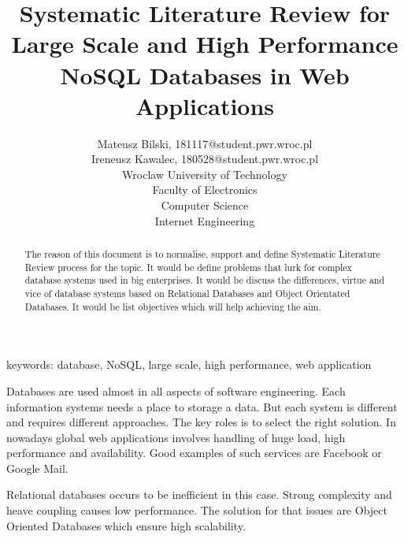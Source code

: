 \documentclass[times, 10pt,twocolumn]{article}
\begin{document}
 

\title{ Systematic Literature Review
       for Large Scale and High Performance NoSQL Databases in Web Applications}

\author{Mateusz Bilski, 181117@student.pwr.wroc.pl \\ Ireneusz Kawalec, 180528@student.pwr.wroc.pl \\ 
Wroclaw University of Technology\\ Faculty of Electronics \\ Computer Science \\ Internet Engineering  \\  
}

\maketitle
\thispagestyle{empty}

\begin{abstract}  

The reason of this document is to normalise, support and define Systematic Literature Review process for the topic.
It would be define problems that lurk for complex database systems used in big enterprises. 
It would be discuss the differences, virtue and vice of database systems based on Relational Databases and Object Orientated Databases.
It would be list objectives which will help achieving the aim.

\end{abstract} 

keywords: database, NoSQL, large scale, high performance, web application


Databases are used almost in all aspects of software engineering. Each 
information systems needs a place to storage a data. But each system is different
and requires different approaches. The key roles is to select the right solution.
In nowadays global web applications involves handling of huge load, high performance and
availability. Good examples of such services are Facebook or Google Mail.

Relational databases occurs to be inefficient in this case. Strong complexity and
heave coupling causes low performance. The solution for that issues are Object Oriented
Databases which ensure high scalability.
\end{document}
